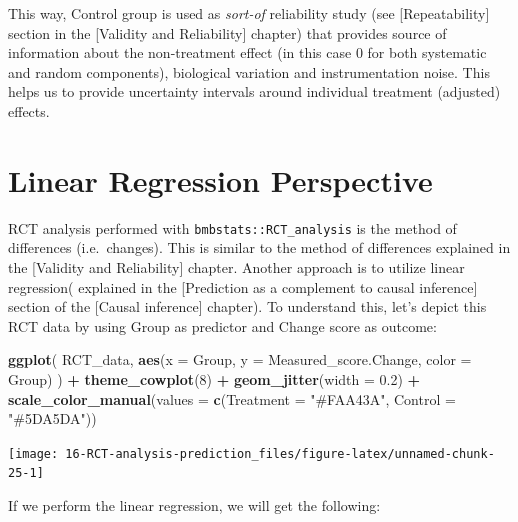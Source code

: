 \documentclass[
]{book}
\newenvironment{Shaded}{\begin{snugshade}}{\end{snugshade}}
\newcommand{\DataTypeTok}[1]{\textcolor[rgb]{0.13,0.29,0.53}{#1}}
\newcommand{\DecValTok}[1]{\textcolor[rgb]{0.00,0.00,0.81}{#1}}
\newcommand{\FloatTok}[1]{\textcolor[rgb]{0.00,0.00,0.81}{#1}}
\newcommand{\KeywordTok}[1]{\textcolor[rgb]{0.13,0.29,0.53}{\textbf{#1}}}
\newcommand{\NormalTok}[1]{#1}
\newcommand{\OperatorTok}[1]{\textcolor[rgb]{0.81,0.36,0.00}{\textbf{#1}}}
\newcommand{\StringTok}[1]{\textcolor[rgb]{0.31,0.60,0.02}{#1}}
\begin{document}
This way, Control group is used as \emph{sort-of} reliability study (see {[}Repeatability{]} section in the {[}Validity and Reliability{]} chapter) that provides source of information about the non-treatment effect (in this case 0 for both systematic and random components), biological variation and instrumentation noise. This helps us to provide uncertainty intervals around individual treatment (adjusted) effects.

\hypertarget{linear-regression-perspective}{%
\section{Linear Regression Perspective}\label{linear-regression-perspective}}

RCT analysis performed with \texttt{bmbstats::RCT\_analysis} is the method of differences (i.e.~changes). This is similar to the method of differences explained in the {[}Validity and Reliability{]} chapter. Another approach is to utilize linear regression( explained in the {[}Prediction as a complement to causal inference{]} section of the {[}Causal inference{]} chapter). To understand this, let's depict this RCT data by using Group as predictor and Change score as outcome:

\begin{Shaded}
\begin{Highlighting}[]
\KeywordTok{ggplot}\NormalTok{(}
\NormalTok{  RCT\_data,}
  \KeywordTok{aes}\NormalTok{(}\DataTypeTok{x =}\NormalTok{ Group, }\DataTypeTok{y =}\NormalTok{ Measured\_score.Change, }\DataTypeTok{color =}\NormalTok{ Group)}
\NormalTok{) }\OperatorTok{+}
\StringTok{  }\KeywordTok{theme\_cowplot}\NormalTok{(}\DecValTok{8}\NormalTok{) }\OperatorTok{+}
\StringTok{  }\KeywordTok{geom\_jitter}\NormalTok{(}\DataTypeTok{width =} \FloatTok{0.2}\NormalTok{) }\OperatorTok{+}
\StringTok{  }\KeywordTok{scale\_color\_manual}\NormalTok{(}\DataTypeTok{values =} \KeywordTok{c}\NormalTok{(}\DataTypeTok{Treatment =} \StringTok{"\#FAA43A"}\NormalTok{, }\DataTypeTok{Control =} \StringTok{"\#5DA5DA"}\NormalTok{))}
\end{Highlighting}
\end{Shaded}

\begin{center}\texttt{[image: 16-RCT-analysis-prediction\_files/figure-latex/unnamed-chunk-25-1]} \end{center}

If we perform the linear regression, we will get the following:
\end{document}

